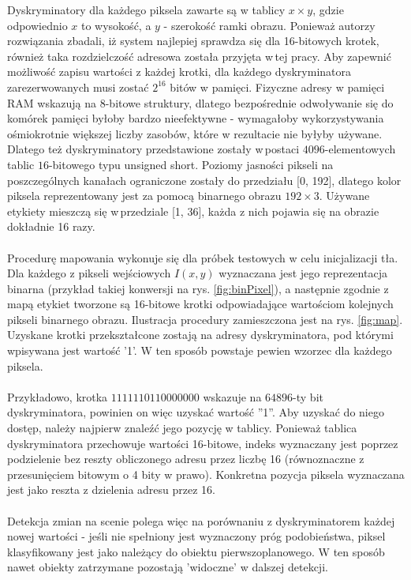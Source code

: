 Dyskryminatory dla każdego piksela zawarte są w tablicy $x\times y$, gdzie odpowiednio $x$ to wysokość, a $y$ - szerokość ramki obrazu. Ponieważ autorzy rozwiązania zbadali, iż system najlepiej sprawdza się dla 16-bitowych krotek, również taka rozdzielczość adresowa została przyjęta w\,tej pracy. Aby zapewnić możliwość zapisu wartości z każdej krotki, dla każdego dyskryminatora zarezerwowanych musi zostać $2^{16}$ bitów w pamięci. Fizyczne adresy w pamięci RAM wskazują na 8-bitowe struktury, dlatego bezpośrednie odwoływanie się do komórek pamięci byłoby bardzo nieefektywne - wymagałoby wykorzystywania ośmiokrotnie większej liczby zasobów, które w rezultacie nie byłyby używane. Dlatego też dyskryminatory przedstawione zostały w\,postaci $4096$-elementowych tablic $16$-bitowego typu unsigned short. Poziomy jasności pikseli na poszczególnych kanałach ograniczone zostały do przedziału [0, 192], dlatego kolor piksela reprezentowany jest za pomocą binarnego obrazu $192 \times 3$. Używane etykiety mieszczą się w\,przedziale [1, 36], każda z nich pojawia się na obrazie dokładnie 16 razy. 
\paragraph{}
Procedurę mapowania wykonuje się dla próbek testowych w celu inicjalizacji tła. Dla każdego z pikseli wejściowych $I(x,y)$ wyznaczana jest jego reprezentacja binarna (przykład takiej konwersji na rys. \ref{fig:binPixel}), a następnie zgodnie z mapą etykiet tworzone są 16-bitowe krotki odpowiadające wartościom kolejnych pikseli binarnego obrazu. Ilustracja procedury zamieszczona jest na rys. \ref{fig:map}. Uzyskane krotki przekształcone zostają na adresy dyskryminatora, pod którymi wpisywana jest wartość '1'. W ten sposób powstaje pewien wzorzec dla każdego piksela.
\paragraph{}
Przykładowo, krotka $1111110110000000$ wskazuje na $64896$-ty bit dyskryminatora, powinien on więc uzyskać wartość ''1''. Aby uzyskać do niego dostęp, należy najpierw znaleźć jego pozycję w tablicy. Ponieważ tablica dyskryminatora przechowuje wartości 16-bitowe, indeks wyznaczany jest poprzez podzielenie bez reszty obliczonego adresu przez liczbę 16 (równoznaczne z przesunięciem bitowym o 4 bity w prawo). Konkretna pozycja piksela wyznaczana jest jako reszta z dzielenia adresu przez 16.   
\paragraph{}
Detekcja zmian na scenie polega więc na porównaniu z dyskryminatorem każdej nowej wartości - jeśli nie spełniony jest wyznaczony próg podobieństwa, piksel klasyfikowany jest jako należący do obiektu pierwszoplanowego. W ten sposób nawet obiekty zatrzymane pozostają 'widoczne' w dalszej detekcji.

